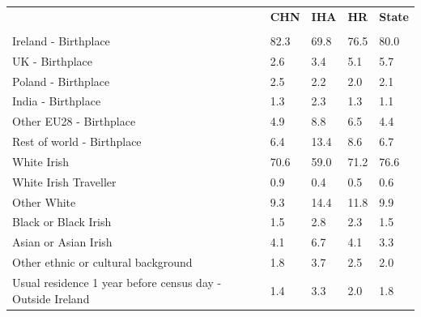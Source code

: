 \documentclass{article}
\begin{document}
\pagebreak
\begin{table}[h]	
\centering
		\begin{tabular}{KTTTT}
  \hline
& \textbf{CHN} & \textbf{IHA} & \textbf{HR}& \textbf{State}\\ 
  \hline
    \\ 
    \hline
Ireland - Birthplace & 82.3& 69.8& 76.5& 80.0\\
UK - Birthplace & 2.6& 3.4& 5.1& 5.7\\
Poland - Birthplace & 2.5& 2.2& 2.0& 2.1\\
India - Birthplace & 1.3& 2.3& 1.3& 1.1\\
Other EU28 - Birthplace & 4.9& 8.8& 6.5& 4.4\\
Rest of world - Birthplace &  6.4& 13.4&  8.6&  6.7\\
    \hline
White Irish & 70.6& 59.0& 71.2& 76.6\\
White Irish Traveller & 0.9& 0.4& 0.5& 0.6\\
Other White &  9.3& 14.4& 11.8&  9.9\\
Black or Black Irish & 1.5& 2.8& 2.3& 1.5\\
Asian or Asian Irish & 4.1& 6.7& 4.1& 3.3\\
Other ethnic or cultural background & 1.8& 3.7& 2.5& 2.0\\
    \hline
Usual residence 1 year before census day - Outside Ireland & 1.4& 3.3& 2.0& 1.8\\


\end{tabular}
\end{table}
\end{document}
